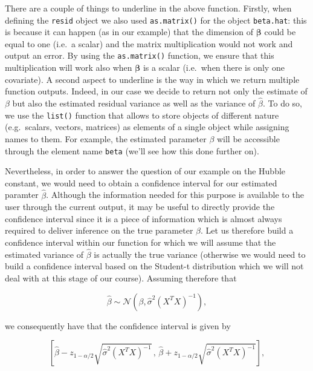 \documentclass[12pt,]{krantz}
\begin{document}
There are a couple of things to underline in the above function.
Firstly, when defining the \texttt{resid} object we also used
\texttt{as.matrix()} for the object \texttt{beta.hat}: this is because
it can happen (as in our example) that the dimension of
\(\boldsymbol{\beta}\) could be equal to one (i.e.~a scalar) and the
matrix multiplication would not work and output an error. By using the
\texttt{as.matrix()} function, we ensure that this multiplication will
work also when \(\boldsymbol{\beta}\) is a scalar (i.e.~when there is
only one covariate). A second aspect to underline is the way in which we
return multiple function outputs. Indeed, in our case we decide to
return not only the estimate of \(\beta\) but also the estimated
residual variance as well as the variance of \(\hat{\beta}\). To do so,
we use the \texttt{list()} function that allows to store objects of
different nature (e.g.~scalars, vectors, matrices) as elements of a
single object while assigning names to them. For example, the estimated
parameter \(\beta\) will be accessible through the element name
\texttt{beta} (we'll see how this done further on).

Nevertheless, in order to answer the question of our example on the
Hubble constant, we would need to obtain a confidence interval for our
estimated paramter \(\hat{\beta}\). Although the information needed for
this purpose is available to the user through the current output, it may
be useful to directly provide the confidence interval since it is a
piece of information which is almost always required to deliver
inference on the true parameter \(\beta\). Let us therefore build a
confidence interval within our function for which we will assume that
the estimated variance of \(\hat{\beta}\) is actually the true variance
(otherwise we would need to build a confidence interval based on the
Student-t distribution which we will not deal with at this stage of our
course). Assuming therefore that

\begin{equation*}
  \hat{\beta} \sim \mathcal{N}\left(\beta,\hat{\sigma}^2(X^TX)^{-1}\right) ,
\end{equation*}

we consequently have that the confidence interval is given by

\begin{equation}
  \left[\hat{\beta} - z_{1-\alpha/2}\sqrt{\hat{\sigma}^2(X^TX)^{-1}} \, , \, \hat{\beta} + z_{1-\alpha/2}\sqrt{\hat{\sigma}^2(X^TX)^{-1}} \right] ,
  \label{eq:cibeta}
\end{equation}
\end{document}
